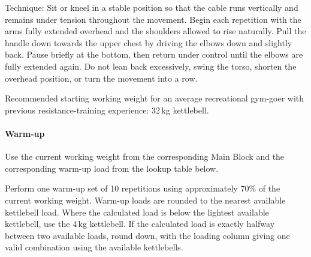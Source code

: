 \documentclass[11pt,a4paper]{article}
\begin{document}
Technique: Sit or kneel in a stable position so that the cable runs vertically and remains under tension throughout the movement. Begin each repetition with the arms fully extended overhead and the shoulders allowed to rise naturally. Pull the handle down towards the upper chest by driving the elbows down and slightly back. Pause briefly at the bottom, then return under control until the elbows are fully extended again. Do not lean back excessively, swing the torso, shorten the overhead position, or turn the movement into a row.

Recommended starting working weight for an average recreational gym-goer with previous resistance-training experience: 32\,kg kettlebell.

\paragraph{Warm-up}

Use the current working weight from the corresponding Main Block and the corresponding warm-up load from the lookup table below.

Perform one warm-up set of 10 repetitions using approximately 70\% of the current working weight. Warm-up loads are rounded to the nearest available kettlebell load. Where the calculated load is below the lightest available kettlebell, use the 4\,kg kettlebell. If the calculated load is exactly halfway between two available loads, round down, with the loading column giving one valid combination using the available kettlebells.
\end{document}
